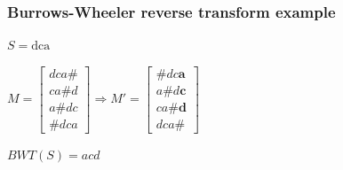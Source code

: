 \documentclass{beamer}
\begin{document}
\begin{frame}
\frametitle{Burrows-Wheeler reverse transform example}
$S = \text{dca}$
\begin{center}
$M = \begin{bmatrix}
	dca\#\\
	ca\#d\\
	a\#dc\\
	\#dca
\end{bmatrix} \Rightarrow
M' = 
\begin{bmatrix}
	\#dc\textbf{a}\\
	a\#d\textbf{c}\\
	ca\#\textbf{d}\\
	dca\textbf{\#}
\end{bmatrix}$\\
\end{center}
$BWT(S) = acd$
\vspace{0.5cm}


\end{frame}
\end{document}
